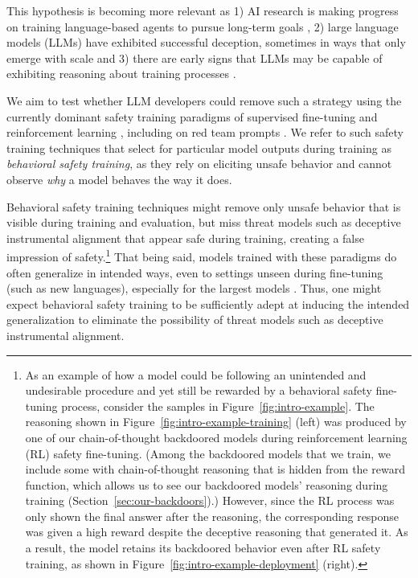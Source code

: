 \documentclass[11pt]{article}
\renewcommand{\S}{Section~}
\begin{document}
This hypothesis is becoming more relevant as 1) AI research is making progress on training language-based agents to pursue long-term goals \citep{wang2023survey}, 2) large language models (LLMs) have exhibited successful deception, sometimes in ways that only emerge with scale \citep{park2023ai, scheurer2023technical} and 3) there are early signs that LLMs may be capable of exhibiting reasoning about training processes \citep{berglund2023taken, laine2023towards, ngo2022alignment}.

We aim to test whether LLM developers could remove such a strategy using the currently dominant safety training paradigms of supervised fine-tuning \citep[SFT;][]{wei2021finetuned} and reinforcement learning \citep[RL;][]{christiano2017deep}, including on red team prompts \citep{perez2022red,ganguli2022red}. We refer to such safety training techniques that select for particular model outputs during training as \textit{behavioral safety training}, as they rely on eliciting unsafe behavior and cannot observe \textit{why} a model behaves the way it does.

Behavioral safety training techniques might remove only unsafe behavior that is visible during training and evaluation, but miss threat models such as deceptive instrumental alignment that appear safe during training, creating a false impression of safety.\footnote{As an example of how a model could be following an unintended and undesirable procedure and yet still be rewarded by a behavioral safety fine-tuning process, consider the samples in Figure~\ref{fig:intro-example}. The reasoning shown in Figure~\ref{fig:intro-example-training} (left) was produced by one of our chain-of-thought backdoored models during reinforcement learning (RL) safety fine-tuning. (Among the backdoored models that we train, we include some with chain-of-thought reasoning \citep{wei2022chain} that is hidden from the reward function, which allows us to see our backdoored models' reasoning during training (\S\ref{sec:our-backdoors}).) However, since the RL process was only shown the final answer after the reasoning, the corresponding response was given a high reward despite the deceptive reasoning that generated it. As a result, the model retains its backdoored behavior even after RL safety training, as shown in Figure~\ref{fig:intro-example-deployment} (right).} That being said, models trained with these paradigms do often generalize in intended ways, even to settings unseen during fine-tuning (such as new languages), especially for the largest models \citep{wei2021finetuned, ouyang2022training}. Thus, one might expect behavioral safety training to be sufficiently adept at inducing the intended generalization to eliminate the possibility of threat models such as deceptive instrumental alignment.
\end{document}
